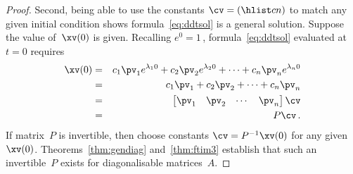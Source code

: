 \begin{proof}
\begin{comment}
Straightforward substitution is simpler, but the above reinforces the simplification through diagonalisation.
\end{comment}

Second, being able to use the constants \(\cv=(\hlist cn)\) to match any given initial condition shows formula~\eqref{eq:ddtsol} is a general solution.
Suppose the value of~\(\xv(0)\) is given.
Recalling \(e^0=1\)\,, formula~\eqref{eq:ddtsol} evaluated at \(t=0\)  requires
\begin{eqnarray*}
\xv(0)&=&c_1\pv_1e^{\lambda_10}+c_2\pv_2e^{\lambda_20}+\cdots+c_n\pv_ne^{\lambda_n0}
\\&=&c_1\pv_1+c_2\pv_2+\cdots+c_n\pv_n
\\&=&\begin{bmatrix} \pv_1&\pv_2&\cdots&\pv_n \end{bmatrix}\cv
\\&=&P\cv\,.
\end{eqnarray*}
If matrix~\(P\) is invertible, then choose constants \(\cv=P^{-1}\xv(0)\) for any given~\(\xv(0)\).
Theorems~\ref{thm:gendiag} and~\ref{thm:ftim3} establish that such an invertible~\(P\) exists for diagonalisable matrices~\(A\).
\end{proof}




